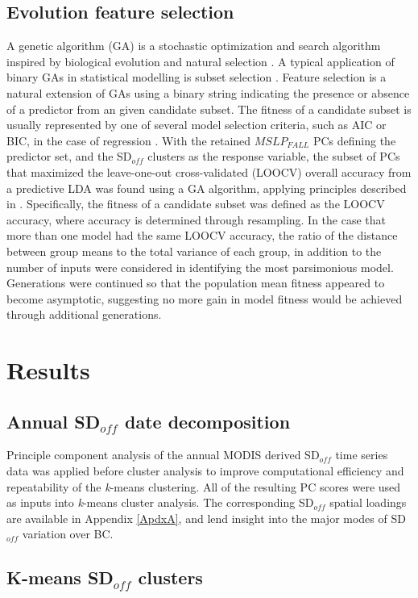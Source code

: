 \documentclass{tATO2e}
\newcommand{\sdoff}{SD$_{off}$}
\begin{document}
\subsection{Evolution feature selection}
A genetic algorithm (GA) is a stochastic optimization and search algorithm inspired by biological evolution and natural selection \citep{Mitchell1998}. A typical application of binary GAs in statistical modelling is subset selection \citep{Scrucca2013}. Feature selection is a natural extension of GAs using a binary string indicating the presence or absence of a predictor from an given candidate subset. The fitness of a candidate subset is usually represented by one of several model selection criteria, such as AIC or BIC, in the case of regression \citep{Bozdogan2003}. With the retained $MSLP_{FALL}$ PCs defining the predictor set, and the \sdoff{} clusters as the response variable, the subset of PCs that maximized the leave-one-out cross-validated (LOOCV) overall accuracy from a predictive LDA was found using a GA algorithm, applying principles described in \citep{Scrucca2013}. Specifically, the fitness of a candidate subset was defined as the LOOCV accuracy, where accuracy is determined through resampling. In the case that more than one model had the same LOOCV accuracy, the ratio of the distance between group means to the total variance of each group, in addition to the number of inputs were considered in identifying the most parsimonious model. Generations were continued so that the population mean fitness appeared to become asymptotic, suggesting no more gain in model fitness would be achieved through additional generations.  

\section{Results}
\subsection{Annual \sdoff{} date decomposition}
Principle component analysis of the annual MODIS derived \sdoff{} time series data was applied before cluster analysis to improve computational efficiency and repeatability of the \textit{k}-means clustering. All of the resulting PC scores were used as inputs into \textit{k}-means cluster analysis. The corresponding \sdoff{} spatial loadings are available in Appendix \ref{ApdxA}, and lend insight into the major modes of \sdoff{} variation over BC.   

\subsection{K-means \sdoff{} clusters}
\end{document}
